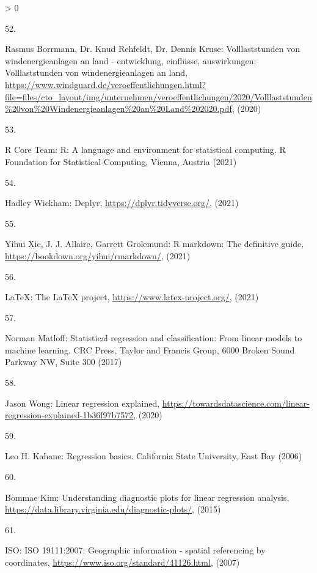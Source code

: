 \documentclass[a4paper,11pt]{article}
\newlength{\cslhangindent}
\newlength{\csllabelwidth}
\newenvironment{CSLReferences}[3] %
 {%
  \setlength{\parindent}{0pt}
  \ifodd #1 \everypar{\setlength{\hangindent}{\cslhangindent}}\ignorespaces\fi
  \ifnum #2 > 0
  \setlength{\parskip}{#2\baselineskip}
  \fi
 }%
 {}
\newcommand{\CSLLeftMargin}[1]{\parbox[t]{\maxof{\widthof{#1}}{\csllabelwidth}}{#1}}
\newcommand{\CSLRightInline}[1]{\parbox[t]{\linewidth}{#1}}
\begin{document}
\begin{CSLReferences}{0}{0}
\leavevmode\hypertarget{ref-RasmusBorrmannDr.KnudRehfeldtDr.DennisKruse.2020}{}%
\CSLLeftMargin{52. }
\CSLRightInline{Rasmus Borrmann, Dr. Knud Rehfeldt, Dr. Dennis Kruse: Volllaststunden von windenergieanlagen an land - entwicklung, einfl{ü}sse, auswirkungen: Volllaststunden von windenergieanlagen an land, \url{https://www.windguard.de/veroeffentlichungen.html?file=files/cto_layout/img/unternehmen/veroeffentlichungen/2020/Volllaststunden\%20von\%20Windenergieanlagen\%20an\%20Land\%202020.pdf}, (2020)}

\leavevmode\hypertarget{ref-R}{}%
\CSLLeftMargin{53. }
\CSLRightInline{R Core Team: R: A language and environment for statistical computing. R Foundation for Statistical Computing, Vienna, Austria (2021)}

\leavevmode\hypertarget{ref-HadleyWickham.2021}{}%
\CSLLeftMargin{54. }
\CSLRightInline{Hadley Wickham: Deplyr, \url{https://dplyr.tidyverse.org/}, (2021)}

\leavevmode\hypertarget{ref-YihuiXieJ.J.AllaireGarrettGrolemund.2021}{}%
\CSLLeftMargin{55. }
\CSLRightInline{Yihui Xie, J. J. Allaire, Garrett Grolemund: R markdown: The definitive guide, \url{https://bookdown.org/yihui/rmarkdown/}, (2021)}

\leavevmode\hypertarget{ref-LaTeX.2021}{}%
\CSLLeftMargin{56. }
\CSLRightInline{LaTeX: The LaTeX project, \url{https://www.latex-project.org/}, (2021)}

\leavevmode\hypertarget{ref-NormanMatloff.2017}{}%
\CSLLeftMargin{57. }
\CSLRightInline{Norman Matloff: Statistical regression and classification: From linear models to machine learning. {CRC Press, Taylor and Francis Group}, 6000 Broken Sound Parkway NW, Suite 300 (2017)}

\leavevmode\hypertarget{ref-JasonWong.2020}{}%
\CSLLeftMargin{58. }
\CSLRightInline{Jason Wong: Linear regression explained, \url{https://towardsdatascience.com/linear-regression-explained-1b36f97b7572}, (2020)}

\leavevmode\hypertarget{ref-LeoH.Kahane.2006}{}%
\CSLLeftMargin{59. }
\CSLRightInline{Leo H. Kahane: Regression basics. {California State University, East Bay} (2006)}

\leavevmode\hypertarget{ref-BommaeKim.2015}{}%
\CSLLeftMargin{60. }
\CSLRightInline{Bommae Kim: Understanding diagnostic plots for linear regression analysis, \url{https://data.library.virginia.edu/diagnostic-plots/}, (2015)}

\leavevmode\hypertarget{ref-ISO.2007}{}%
\CSLLeftMargin{61. }
\CSLRightInline{ISO: ISO 19111:2007: Geographic information - spatial referencing by coordinates, \url{https://www.iso.org/standard/41126.html}, (2007)}


\end{CSLReferences}
\end{document}
